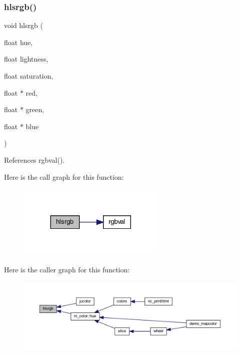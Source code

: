 \subsubsection{\texorpdfstring{hlsrgb()}{hlsrgb()}}
{\footnotesize\ttfamily void hlsrgb (\begin{DoxyParamCaption}\item[{float}]{hue,  }\item[{float}]{lightness,  }\item[{float}]{saturation,  }\item[{float $\ast$}]{red,  }\item[{float $\ast$}]{green,  }\item[{float $\ast$}]{blue }\end{DoxyParamCaption})}



References rgbval().

Here is the call graph for this function\+:
\nopagebreak
\begin{figure}[H]
\begin{center}
\leavevmode
\includegraphics[width=200pt]{C-hlsrgb_8c_ad9e23862110e6afd4136221b830b29e7_cgraph}
\end{center}
\end{figure}
Here is the caller graph for this function\+:
\nopagebreak
\begin{figure}[H]
\begin{center}
\leavevmode
\includegraphics[width=350pt]{C-hlsrgb_8c_ad9e23862110e6afd4136221b830b29e7_icgraph}
\end{center}
\end{figure}

